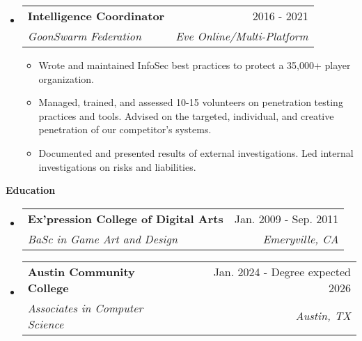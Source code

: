 \documentclass[letterpaper,10pt]{article}[leftmargin=*]
\makeatletter
\def \entryspacing {-0pt}
\renewcommand{\section}[2]{\vspace{5pt}
  \colorbox{secondary}{\color{white}\raggedbottom\normalsize\textbf{{#1}{\hspace{7pt}#2}}}
}
\newcommand{\resumeEntryStart}{\begin{itemize}[leftmargin=2.5mm]}
\newcommand{\resumeEntryEnd}{\end{itemize}\vspace{\entryspacing}}
\newcommand{\resumeItemListStart}{\begin{itemize}[leftmargin=4.5mm]}
\newcommand{\resumeItemListEnd}{\end{itemize}}
\newcommand{\resumeItem}[1]{
  \item\small{
    {#1 \vspace{-2pt}}
  }
}
\newcommand{\resumeEntryTSDL}[4]{
  \vspace{-1pt}\item[]
    \begin{tabularx}{0.97\textwidth}{X@{\hspace{60pt}}r}
      \textbf{\color{primary}#1} & {\firabook\color{accent}\small#2} \\
      \textit{\color{accent}\small#3} & \textit{\color{accent}\small#4} \\
    \end{tabularx}\vspace{-6pt}
}
\makeatother
\begin{document}
  \resumeEntryStart
    \resumeEntryTSDL
      {Intelligence Coordinator}{2016 - 2021}
      {GoonSwarm Federation}{Eve Online/Multi-Platform}
    \resumeItemListStart
      \resumeItem {Wrote and maintained InfoSec best practices to protect a 35,000+ player organization. }
      \resumeItem {Managed, trained, and assessed 10-15 volunteers on penetration testing practices and tools. Advised on the targeted, individual, and creative penetration of our competitor's systems. }
      \resumeItem{Documented and presented results of external investigations. Led internal investigations on risks and liabilities. }
    \resumeItemListEnd
  \resumeEntryEnd

\section{\faGraduationCap}{Education}

  \resumeEntryStart
    \resumeEntryTSDL
      {Ex’pression College of Digital Arts}{Jan. 2009 - Sep. 2011}
      {BaSc in Game Art and Design}{Emeryville, CA}
      \resumeEntryTSDL
      {Austin Community College}{Jan. 2024 - Degree expected 2026} 
      {Associates in Computer Science}{Austin, TX}
  \resumeEntryEnd
\end{document}
